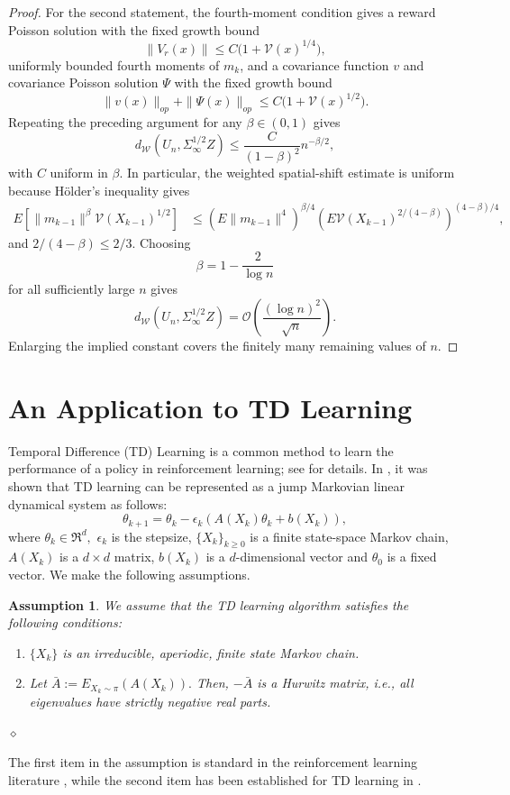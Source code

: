 \documentclass[11pt]{article}
\newtheorem{assumption}{Assumption}
\newcommand{\ve}{\mathscr{V}}
\begin{document}
\begin{proof}
For the second statement, the fourth-moment condition gives a reward Poisson
solution with the fixed growth bound
\[
    \|V_r(x)\|\leq C\bigl(1+\ve(x)^{1/4}\bigr),
\]
uniformly bounded fourth moments of $m_k$, and a covariance function $v$ and
covariance Poisson solution $\Psi$ with the fixed growth bound
\[
    \|v(x)\|_{op}+\|\Psi(x)\|_{op}
    \leq
    C\bigl(1+\ve(x)^{1/2}\bigr).
\]
Repeating the preceding argument for any $\beta\in(0,1)$ gives
\[
    d_{\mathcal W}(U_n,\Sigma_\infty^{1/2}Z)
    \leq
    \frac{C}{(1-\beta)^2}n^{-\beta/2},
\]
with $C$ uniform in $\beta$. In particular, the weighted spatial-shift
estimate is uniform because H\"older's inequality gives
\begin{align*}
E\left[\|m_{k-1}\|^\beta\ve(X_{k-1})^{1/2}\right]
&\leq
\left(E\|m_{k-1}\|^4\right)^{\beta/4}
\left(E\ve(X_{k-1})^{2/(4-\beta)}\right)^{(4-\beta)/4},
\end{align*}
and $2/(4-\beta)\leq2/3$. Choosing
\[
    \beta=1-\frac{2}{\log n}
\]
for all sufficiently large $n$ gives
\[
    d_{\mathcal W}(U_n,\Sigma_\infty^{1/2}Z)
    =
    \mathcal O\!\left(\frac{(\log n)^2}{\sqrt n}\right).
\]
Enlarging the implied constant covers the finitely many remaining values of
$n$.
\end{proof}


\section{An Application to TD Learning}\label{sec: TD}

Temporal Difference (TD) Learning is a common method to learn the performance of a policy in reinforcement learning; see \citep{bertsekas1996neuro,sutton2018reinforcement} for details. In \citep{tsitsiklis1996analysis}, it was shown that TD learning can be represented as a jump Markovian linear dynamical system as follows:
\begin{equation}\label{eq: TD}
    \theta_{k+1}=\theta_k-\epsilon_k (A(X_k)\theta_k+b(X_k)),
\end{equation}
where $\theta_k\in \Re^d,$ $\epsilon_k$ is the stepsize, $\{X_k\}_{k\geq 0}$ is a finite state-space Markov chain, $A(X_k)$ is a $d\times d$ matrix, $b(X_k)$ is a $d$-dimensional vector and $\theta_0$ is a fixed vector. We make the following assumptions.
\begin{assumption}\label{assume: TD}
We assume that the TD learning algorithm satisfies the following conditions:
\begin{enumerate}
    \item $\{X_k\}$ is an irreducible, aperiodic, finite state Markov chain. 
    \item Let $\bar{A}:=E_{X_k\sim\pi}(A(X_k)).$ Then, $-\bar{A}$ is a Hurwitz matrix, i.e., all eigenvalues have strictly negative real parts.
\end{enumerate}
\hfill $\diamond$
\end{assumption}
The first item in the assumption is standard in the reinforcement learning literature \citep{sutton2018reinforcement}, while the second item has been established for TD learning in \citep{tsitsiklis1996analysis}.
\end{document}
